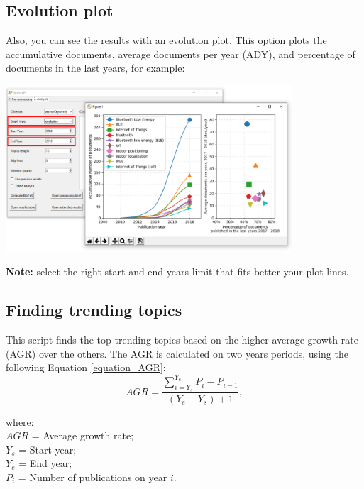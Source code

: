 \documentclass[10pt,letterpaper]{article}
\begin{document}
\subsection{Evolution plot}

Also, you can see the results with an evolution plot. This option plots the accumulative documents, average documents per year (ADY), and percentage of documents in the last years, for example:

\begin{center}
	\includegraphics[width=0.8\textwidth]{./figures/win_analysis6.eps}
\end{center}

\textbf{Note:} select the right start and end years limit that fits better your plot lines.

\subsection{Finding trending topics}

This script finds the top trending topics based on the higher average growth rate (AGR) over the others. The AGR is calculated on two years periods, using the following Equation \eqref{equation_AGR}:
\begin{equation*}
AGR = \frac{\sum\limits_{i = Y_s}^{Y_e}P_i - P_{i-1}}{(Y_e - Y_s)+1},  
\label{equation_AGR}
\end{equation*}

\setlength{\leftskip}{5cm}
\hspace*{-1cm}where:\\
$AGR$ = Average growth rate;\\
$Y_s$ = Start year;\\
$Y_e$ = End year;\\
$P_i$ = Number of publications on year $i.$\\

\setlength{\leftskip}{0pt}
\end{document}
